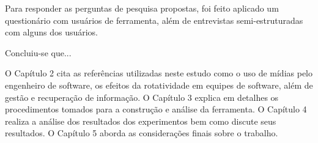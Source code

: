 

Para responder as perguntas de pesquisa propostas, foi feito aplicado um questionário com usuários de ferramenta, além de entrevistas semi-estruturadas com alguns dos usuários.

Concluiu-se que...

O Capítulo 2 cita as referências utilizadas neste estudo como o uso de mídias pelo engenheiro de software, os efeitos da rotatividade em equipes de software, além de gestão e recuperação de informação. O Capítulo 3 explica em detalhes os procedimentos tomados para a construção e análise da ferramenta. O Capítulo 4 realiza a análise dos resultados dos experimentos bem como discute seus resultados. O Capítulo 5 aborda as considerações finais sobre o trabalho.






